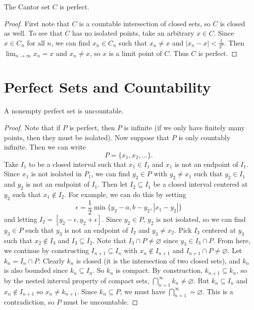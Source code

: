 \begin{theorem}
  The Cantor set $C$ is perfect.
\end{theorem}

\begin{proof}
  First note that $C$ is a countable intersection of
  closed sets, so $C$ is closed as well.
  To see that $C$ has no isolated points, take an arbitrary
  $x \in C$. Since $x \in C_n$ for all $n$, we can find
  $x_n \in C_n$ such that $x_n \ne x$ and
  $|x_n - x| < \frac{1}{3^n}$. Then $\lim_{n \to \infty} x_n = x$
  and $x_n \ne x$, so $x$ is a limit point of $C$.
  Thus $C$ is perfect.
\end{proof}

\section{Perfect Sets and Countability}

\begin{theorem}
  A nonempty perfect set is uncountable.
\end{theorem}

\begin{proof}
  Note that if $P$ is perfect, then $P$ is infinite
  (if we only have finitely many points, then they must be
  isolated). Now suppose that $P$ is only countably infinite.
  Then we can write
  \[P = \{x_1, x_2, \dots\}.\]
  Take $I_1$ to be a closed interval such that $x_1 \in I_1$
  and $x_1$ is not an endpoint of $I_1$.
  Since $x_1$ is not isolated in $P_1$, we can find $y_2 \in P$
  with $y_2 \ne x_1$
  such that $y_2 \in I_1$ and $y_2$ is not an endpoint of $I_1$.
  Then let $I_2 \subseteq I_1$ be a closed interval centered at
  $y_2$ such that $x_1 \notin I_2$. For example, we can do this
  by setting
  \[
    \epsilon = \frac{1}{2}\min\{y_2 - a, b - y_2, |x_1 - y_2|\}
  \]
  and letting $I_2 = [y_2 - \epsilon, y_2 + \epsilon]$.
  Since $y_2 \in P$, $y_2$ is not isolated, so we can find
  $y_3 \in P$ such that $y_3$ is not an endpoint of $I_2$ and
  $y_3 \ne x_2$. Pick $I_3$ centered at $y_3$ such that
  $x_2 \notin I_3$ and $I_3 \subseteq I_2$. Note that
  $I_3 \cap P \ne \varnothing$ since $y_3 \in I_3 \cap P$.
  From here, we continue by constructing
  $I_{n + 1} \subseteq I_n$ with $x_n \notin I_{n + 1}$ and
  $I_{n + 1} \cap P \ne \varnothing$. Let
  $k_n = I_n \cap P$. Clearly $k_n$ is closed (it is the
  intersection of two closed sets), and $k_n$
  is also bounded since $k_n \subseteq I_n$. So $k_n$ is
  compact. By construction, $k_{n + 1} \subseteq k_n$, so
  by the nested interval property of compact sets,
  $\bigcap_{n = 1}^\infty k_n \ne \varnothing$. But
  $k_n \subseteq I_n$ and $x_n \notin I_{n + 1}$
  so $x_n \ne k_{n + 1}$. Since $k_n \subseteq P$, we must
  have $\bigcap_{n = 1}^\infty = \varnothing$. This is
  a contradiction, so $P$ must be uncountable.
\end{proof}
